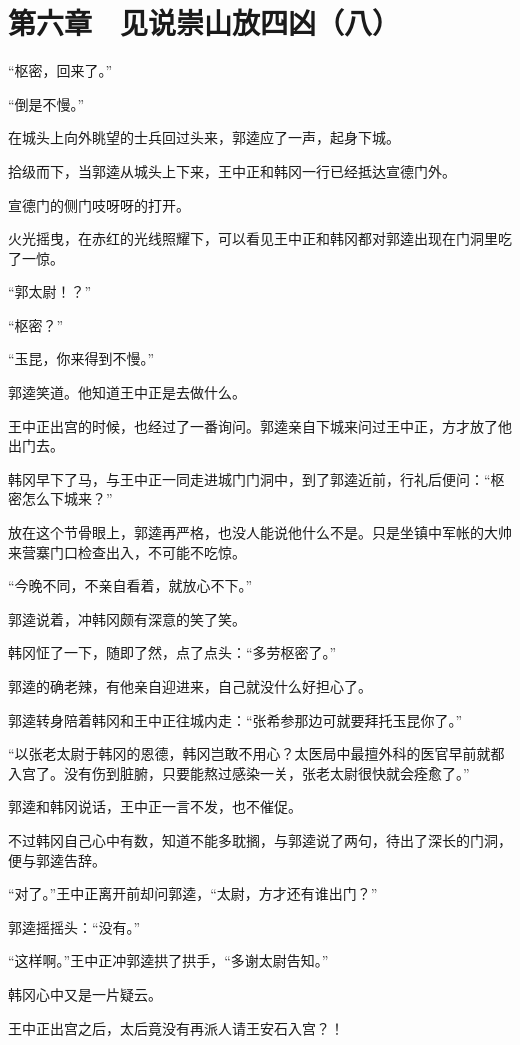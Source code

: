 \section{第六章　见说崇山放四凶（八）}

“枢密，回来了。”

“倒是不慢。”

在城头上向外眺望的士兵回过头来，郭逵应了一声，起身下城。

拾级而下，当郭逵从城头上下来，王中正和韩冈一行已经抵达宣德门外。

宣德门的侧门吱呀呀的打开。

火光摇曳，在赤红的光线照耀下，可以看见王中正和韩冈都对郭逵出现在门洞里吃了一惊。

“郭太尉！？”

“枢密？”

“玉昆，你来得到不慢。”

郭逵笑道。他知道王中正是去做什么。

王中正出宫的时候，也经过了一番询问。郭逵亲自下城来问过王中正，方才放了他出门去。

韩冈早下了马，与王中正一同走进城门门洞中，到了郭逵近前，行礼后便问：“枢密怎么下城来？”

放在这个节骨眼上，郭逵再严格，也没人能说他什么不是。只是坐镇中军帐的大帅来营寨门口检查出入，不可能不吃惊。

“今晚不同，不亲自看着，就放心不下。”

郭逵说着，冲韩冈颇有深意的笑了笑。

韩冈怔了一下，随即了然，点了点头：“多劳枢密了。”

郭逵的确老辣，有他亲自迎进来，自己就没什么好担心了。

郭逵转身陪着韩冈和王中正往城内走：“张希参那边可就要拜托玉昆你了。”

“以张老太尉于韩冈的恩德，韩冈岂敢不用心？太医局中最擅外科的医官早前就都入宫了。没有伤到脏腑，只要能熬过感染一关，张老太尉很快就会痊愈了。”

郭逵和韩冈说话，王中正一言不发，也不催促。

不过韩冈自己心中有数，知道不能多耽搁，与郭逵说了两句，待出了深长的门洞，便与郭逵告辞。

“对了。”王中正离开前却问郭逵，“太尉，方才还有谁出门？”

郭逵摇摇头：“没有。”

“这样啊。”王中正冲郭逵拱了拱手，“多谢太尉告知。”

韩冈心中又是一片疑云。

王中正出宫之后，太后竟没有再派人请王安石入宫？！

